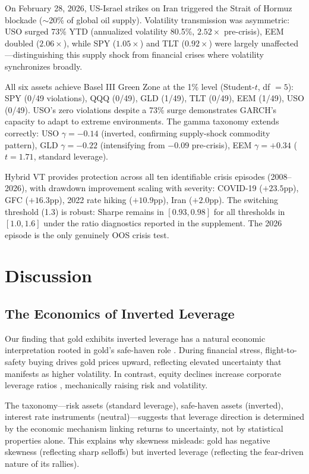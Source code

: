 On February 28, 2026, US-Israel strikes on Iran triggered the Strait of Hormuz blockade ($\sim$20\% of global oil supply). Volatility transmission was asymmetric: USO surged 73\% YTD (annualized volatility 80.5\%, $2.52\times$ pre-crisis), EEM doubled ($2.06\times$), while SPY ($1.05\times$) and TLT ($0.92\times$) were largely unaffected---distinguishing this supply shock from financial crises where volatility synchronizes broadly.

All six assets achieve Basel III Green Zone at the 1\% level (Student-$t$, df $= 5$): SPY (0/49 violations), QQQ (0/49), GLD (1/49), TLT (0/49), EEM (1/49), USO (0/49). USO's zero violations despite a 73\% surge demonstrates GARCH's capacity to adapt to extreme environments. The gamma taxonomy extends correctly: USO $\gamma = -0.14$ (inverted, confirming supply-shock commodity pattern), GLD $\gamma = -0.22$ (intensifying from $-0.09$ pre-crisis), EEM $\gamma = +0.34$ ($t = 1.71$, standard leverage).

Hybrid VT provides protection across all ten identifiable crisis episodes (2008--2026), with drawdown improvement scaling with severity: COVID-19 ($+23.5$pp), GFC ($+16.3$pp), 2022 rate hiking ($+10.9$pp), Iran ($+2.0$pp). The switching threshold (1.3) is robust: Sharpe remains in $[0.93, 0.98]$ for all thresholds in $[1.0, 1.6]$ under the ratio diagnostics reported in the supplement. The 2026 episode is the only genuinely OOS crisis test.



\section{Discussion}\label{sec:implications}

\subsection{The Economics of Inverted Leverage}

Our finding that gold exhibits inverted leverage has a natural economic interpretation rooted in gold's safe-haven role \citep{baur2010safe}. During financial stress, flight-to-safety buying drives gold prices upward, reflecting elevated uncertainty that manifests as higher volatility. In contrast, equity declines increase corporate leverage ratios \citep{black1976}, mechanically raising risk and volatility.

The taxonomy---risk assets (standard leverage), safe-haven assets (inverted), interest rate instruments (neutral)---suggests that leverage direction is determined by the economic mechanism linking returns to uncertainty, not by statistical properties alone. This explains why skewness misleads: gold has negative skewness (reflecting sharp selloffs) but inverted leverage (reflecting the fear-driven nature of its rallies).


